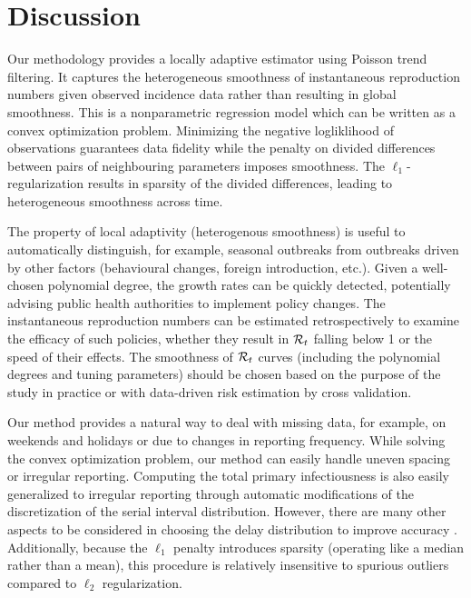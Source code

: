 \section{Discussion}
\label{sec:disc}

Our methodology provides a locally adaptive estimator using Poisson
trend filtering. It captures the heterogeneous smoothness of instantaneous
reproduction numbers given observed incidence data rather than resulting in
global smoothness. This is a nonparametric regression model which can be written
as a convex optimization problem. Minimizing the negative logliklihood of
observations guarantees data fidelity while the penalty on divided differences
between pairs of neighbouring parameters imposes smoothness. The
$\ell_1$-regularization results in sparsity of the divided differences,
leading to heterogeneous smoothness across time. 


The property of local adaptivity (heterogenous smoothness) is useful to
automatically distinguish, for example, seasonal outbreaks from outbreaks driven
by other factors (behavioural changes, foreign introduction, etc.). Given a
well-chosen polynomial degree, the growth rates can be quickly detected,
potentially advising public health authorities to implement policy changes. The
instantaneous reproduction numbers can be estimated retrospectively to examine
the efficacy of such policies, whether they result in $\mathcal{R}_t$ falling below 1
or the speed of their effects. The smoothness of $\mathcal{R}_t$ curves (including the
polynomial degrees and tuning parameters) should be chosen based on the purpose
of the study in practice or with data-driven risk estimation by cross validation. 


Our method provides a natural way to deal with missing data, for example, on
weekends and holidays or due to changes in reporting frequency. While solving
the convex optimization problem, our method can easily handle uneven spacing or
irregular reporting. Computing the total primary infectiousness is also easily
generalized to irregular reporting through automatic modifications of the
discretization of the serial interval distribution. However, there are many
other aspects to be considered in choosing the delay distribution to improve
accuracy \citep{park2024estimating}. Additionally, because the $\ell_1$ penalty
introduces sparsity (operating like a median rather than a mean), this procedure
is relatively insensitive to spurious outliers compared to $\ell_2$
regularization. 


